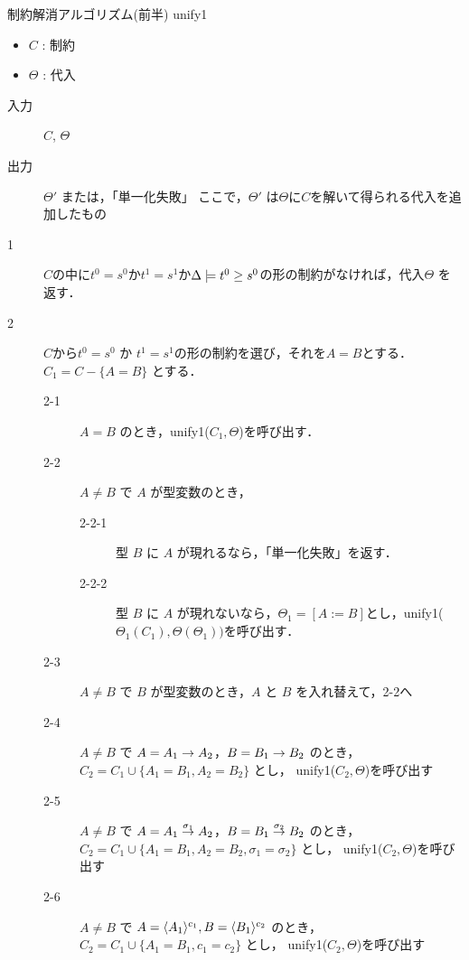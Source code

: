 \begin{oframed}
  制約解消アルゴリズム(前半) unify1
  \begin{itemize}
    \setlength{\itemsep}{-5pt}
  \item $C$ : 制約
  \item $\Theta$ : 代入
  \end{itemize}

  \begin{description}
  \item[入力] $C$, $\Theta$
  \item[出力] $\Theta'$ または，「単一化失敗」
    ここで，$\Theta'$ は$\Theta$に$C$を解いて得られる代入を追加したもの
  \end{description}

  \begin{description}           %
  \item[1] $C$の中に$t^0=s^0$か$t^1=s^1$か$\Delta \models \longer{t^0}{s^0}$の形の制約がなければ，代入$\Theta$ を返す．
  \item[2] $C$から$t^0=s^0$ か $t^1=s^1$の形の制約を選び，それを$A = B$とする．$C_1 = C - \{A = B\}$ とする．
    \begin{description}
    \item[2-1] $A = B$ のとき，unify1($C_1, \Theta$)を呼び出す．
    \item[2-2] $A \neq B$ で $A$ が型変数のとき，
      \begin{description}
      \item[2-2-1] 型 $B$ に $A$ が現れるなら，「単一化失敗」を返す．
      \item[2-2-2] 型 $B$ に $A$ が現れないなら，$\Theta_1 = [A := B]$とし，unify1($\Theta_1(C_1), \Theta(\Theta_1))$を呼び出す．
      \end{description}
    \item[2-3] $A \neq B$ で $B$ が型変数のとき，$A$ と $B$ を入れ替えて，2-2へ
    \item[2-4] $A \neq B$ で $A = \funT{A_1}{A_2}{}$，$B = \funT{B_1}{B_2}{}$ のとき， $C_2 = C_1 \cup \{A_1 = B_1, A_2 = B_2\}$ とし， unify1($C_2, \Theta$)を呼び出す
    \item[2-5] $A \neq B$ で $A = \funT{A_1}{A_2}{\sigma_1}$，$B = \funT{B_1}{B_2}{\sigma_2}$ のとき， $C_2 = C_1 \cup \{A_1 = B_1, A_2 = B_2, \sigma_1 = \sigma_2\}$ とし， unify1($C_2, \Theta$)を呼び出す
    \item[2-6] $A \neq B$ で $A = \codeT{A_1}{c_1} , B = \codeT{B_1}{c_2}$ のとき，$C_2 = C_1 \cup \{A_1 = B_1, c_1 = c_2\}$ とし， unify1($C_2, \Theta$)を呼び出す

\end{description}
\end{description}
\end{oframed}
